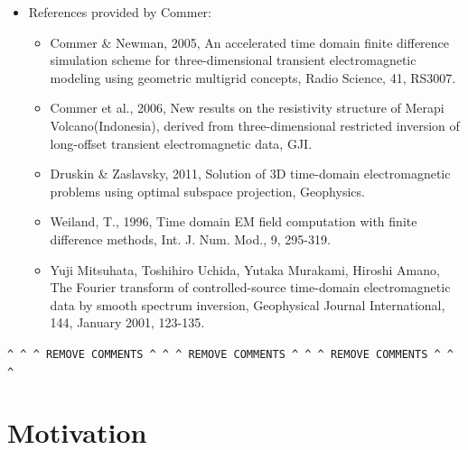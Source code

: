 \documentclass[extra, camera,%
    referee,     %
]{gji}
\begin{document}
{\begin{itemize}
    the order analysis given in Mulder 2008 where some order analysis was
    done.
  \item References provided by Commer:
    \begin{itemize}
      \item Commer \& Newman, 2005, An accelerated time domain finite
        difference simulation scheme for three-dimensional transient
        electromagnetic modeling using geometric multigrid concepts, Radio
        Science, 41, RS3007.
      \item Commer et al., 2006, New results on the resistivity structure of
        Merapi Volcano(Indonesia), derived from three-dimensional restricted
        inversion of long-offset transient electromagnetic data, GJI.
      \item Druskin \& Zaslavsky, 2011, Solution of 3D time-domain
        electromagnetic problems using optimal subspace projection,
        Geophysics.
      \item Weiland, T., 1996, Time domain EM field computation with finite
        difference methods, Int. J. Num. Mod., 9, 295-319.
      \item Yuji Mitsuhata, Toshihiro Uchida, Yutaka Murakami, Hiroshi Amano,
        The Fourier transform of controlled-source time-domain electromagnetic
        data by smooth spectrum inversion, Geophysical Journal International,
        144, January 2001, 123-135.
    \end{itemize}
\end{itemize}

}
{\color{alizarin}
\verb!^ ^ ^ REMOVE COMMENTS ^ ^ ^ REMOVE COMMENTS ^ ^ ^ REMOVE COMMENTS ^ ^ ^!
}



\section{Motivation}  %
\end{document}
